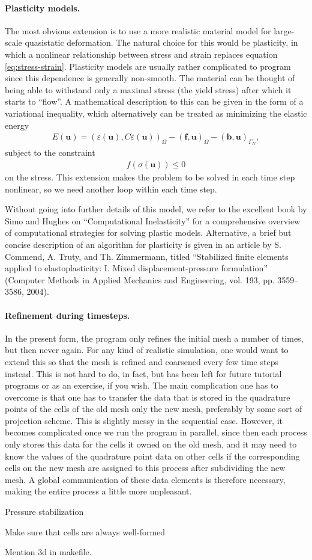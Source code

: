 \documentclass{article}
\renewcommand{\vec}[1]{\mathbf{#1}}
\begin{document}
\paragraph*{Plasticity models.} The most obvious extension is to use a more
realistic material model for large-scale quasistatic deformation. The natural
choice for this would be plasticity, in which a nonlinear relationship between
stress and strain replaces equation \eqref{eq:stress-strain}. Plasticity
models are usually rather complicated to program since this dependence is
generally non-smooth. The material can be thought of being able to withstand
only a maximal stress (the yield stress) after which it starts to ``flow''. A
mathematical description to this can be given in the form of a variational
inequality, which alternatively can be treated as minimizing the elastic
energy
\begin{gather}
  E(\vec u) = 
  (\varepsilon(\vec u), C\varepsilon(\vec u))_{\Omega}
  - (\vec f, \vec u)_{\Omega} - (\vec b, \vec u)_{\Gamma_N},
\end{gather}
subject to the constraint
\begin{gather}
  f(\sigma(\vec u)) \le 0
\end{gather}
on the stress. This extension makes the problem to be solved in each time step
nonlinear, so we need another loop within each time step.

Without going into further details of this model, we refer to the excellent
book by Simo and Hughes on ``Computational Inelasticity'' for a
comprehensive overview of computational strategies for solving plastic
models. Alternative, a brief but concise description of an algorithm for
plasticity is given in an article by S. Commend, A. Truty, and Th. Zimmermann,
titled ``Stabilized finite elements applied to 
elastoplasticity: I. Mixed displacement-pressure formulation''
(Computer Methods in Applied Mechanics and Engineering, vol. 193,
pp. 3559--3586, 2004).


\paragraph*{Refinement during timesteps.} In the present form, the program
only refines the initial mesh a number of times, but then never again. For any
kind of realistic simulation, one would want to extend this so that the mesh
is refined and coarsened every few time steps instead. This is not hard to do,
in fact, but has been left for future tutorial programs or as an exercise, if
you wish. The main complication one has to overcome is that one has to
transfer the data that is stored in the quadrature points of the cells of the
old mesh only the new mesh, preferably by some sort of projection scheme. This
is slightly messy in the sequential case. However, it becomes complicated once
we run the program in parallel, since then each process only stores this data
for the cells it owned on the old mesh, and it may need to know the values of
the quadrature point data on other cells if the corresponding cells on the new
mesh are assigned to this process after subdividing the new mesh. A global
communication of these data elements is therefore necessary, making the entire
process a little more unpleasant.


Pressure stabilization

Make sure that cells are always well-formed

Mention 3d in makefile.
\end{document}
